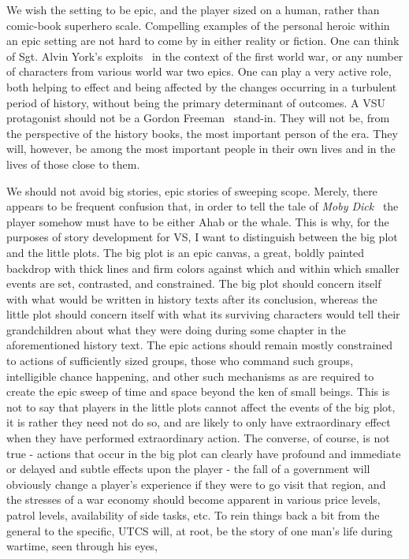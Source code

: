 We wish the setting to be epic, and the player sized on a human,
rather than comic-book superhero scale. Compelling examples of the
personal heroic within an epic setting are not hard to come by in
either reality or fiction. One can think of Sgt. Alvin York's
exploits~\cite{SergeantYork} in the context of the first world war, or
any number of characters from various world war two epics. One can
play a very active role, both helping to effect and being affected by
the changes occurring in a turbulent period of history, without being
the primary determinant of outcomes. A VSU protagonist should not be a
Gordon Freeman~\cite{Half-Life-GordonFreeman} stand-in. They will not
be, from the perspective of the history books, the most important
person of the era. They will, however, be among the most important
people in their own lives and in the lives of those close to them.

We should not avoid big stories, epic stories of sweeping scope. Merely,
there appears to be frequent confusion that, in order to tell the tale
of \emph{Moby Dick}~\cite{MobyDick} the player somehow must have to be either
Ahab or the whale. This is why, for the purposes of story development
for VS, I want to distinguish between the big plot and the little
plots. The big plot is an epic canvas, a great, boldly painted
backdrop with thick lines and firm colors against which and within
which smaller events are set, contrasted, and constrained. The big
plot should concern itself with what would be written in history texts
after its conclusion, whereas the little plot should concern itself
with what its surviving characters would tell their grandchildren
about what they were doing during some chapter in the aforementioned
history text. The epic actions should remain mostly constrained to
actions of sufficiently sized groups, those who command such groups,
intelligible chance happening, and other such mechanisms as are
required to create the epic sweep of time and space beyond the ken of
small beings. This is not to say that players in the little plots
cannot affect the events of the big plot, it is rather they need not
do so, and are likely to only have extraordinary effect when they have
performed extraordinary action. The converse, of course, is not true -
actions that occur in the big plot can clearly have profound and
immediate or delayed and subtle effects upon the player - the fall of
a government will obviously change a player's experience if they were
to go visit that region, and the stresses of a war economy should
become apparent in various price levels, patrol levels, availability of
side tasks, etc. To rein things back a bit from the general to the
specific, UTCS will, at root, be the story of one man's life during
wartime, seen through his eyes,

